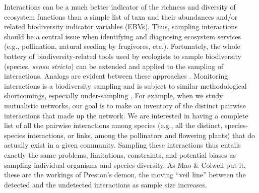 \documentclass[12pt]{article}
\begin{document}
Interactions can be a much better indicator of the richness and diversity of ecosystem functions than a simple list of taxa and their abundances and\slash or related biodiversity indicator variables (EBVs). Thus, sampling interactions should be a central issue when identifying and diagnosing ecosystem services (e.g., pollination, natural seeding by frugivores, etc.). Fortunately, the whole battery of biodiversity-related tools used by ecologists to sample biodiversity (species, \emph{sensu stricto}) can be extended and applied to the sampling of interactions. Analogs are evident between these approaches \citeyearpar[see Table 2 in ][]{Colwell:2004fi,Jordano:2009c}. Monitoring interactions is a biodiversity sampling and is subject to similar methodological shortcomings, especially under-sampling \citep{E31/2562,Jordano:2009c,Coddington:2009fi,Vazquez:2009p82,Dorado:2011cf,RiveraHutinel:2012vn}. For example, when we study mutualistic networks, our goal is to make an inventory of the distinct pairwise interactions that made up the network. We are interested in having a complete list of all the pairwise interactions among species (e.g., all the distinct, species-species interactions, or links, among the pollinators and flowering plants) that do actually exist in a given community. Sampling these interactions thus entails exactly the same problems, limitations, constraints, and potential biases as sampling individual organisms and species diversity. As Mao \& Colwell \citeyearpar{Mao:2005tka} put it, these are the workings of Preston’s demon, the moving ``veil line'' \citep{E2/813} between the detected and the undetected interactions as sample size increases.
\end{document}
